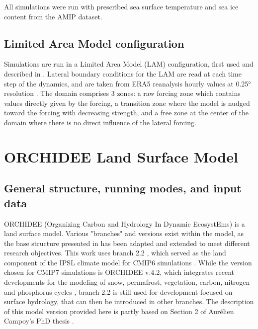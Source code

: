 All simulations were run with prescribed sea surface temperature and sea ice content from the AMIP dataset.

\subsection{Limited Area Model configuration}
Simulations are run in a Limited Area Model (LAM) configuration, first used and described in \citet{raillard_leveraging_2024}.
Lateral boundary conditions for the LAM are read at each time step of the dynamics, and are taken from ERA5 reanalysis hourly values at 0.25° resolution \citep{hersbach_era5_2020}.
The domain comprises 3 zones: a raw forcing zone which contains values directly given by the forcing, a transition zone  where the model is nudged toward the forcing with decreasing strength, and a free zone at the center of the domain where there is no direct influence of the lateral forcing. 

\section{ORCHIDEE Land Surface Model}
\subsection{General structure, running modes, and input data}
ORCHIDEE (Organizing Carbon and Hydrology In Dynamic EcosystEms) is a land surface model. Various "branches" and versions exist within the model, as the base structure presented in \citet{krinner_dynamic_2005} has been adapted and extended to meet different research objectives. 
This work uses branch 2.2 \citep{cheruy_improved_2020}, which served as the land component of the IPSL climate model for CMIP6 simulations \citep{boucher_presentation_2020}. While the version chosen for CMIP7 simulations is ORCHIDEE v.4.2, which integrates recent developments for the modeling of snow, permafrost, vegetation, carbon, nitrogen and phosphorus cycles %
, branch 2.2 is still used for development focused on surface hydrology, that can then be introduced in other branches.
The description of this model version provided here is partly based on Section 2 of Aurélien Campoy’s PhD thesis \citep{campoy_influence_2013}. %

